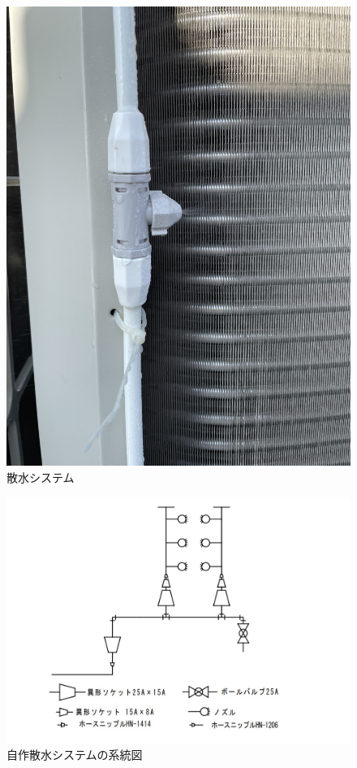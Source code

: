 \documentclass[a4j,fleqn,dvipdfmx,uplatex]{jsarticle}
\begin{document}
\begin{figure}[htb]
\begin{minipage}[b]{0.45\linewidth}
      \includegraphics[width=\linewidth]{img/IMG_0142.jpg}
    \end{minipage}
  \caption{散水システム}
  \label{fig2:watering_sys}
\end{figure}

\begin{figure}[htb]
  \centering
  \includegraphics[width=\linewidth]{img/flow.jpg}
  \caption{自作散水システムの系統図}
  \label{fig:w_s_flow}
\end{figure}
\end{document}
